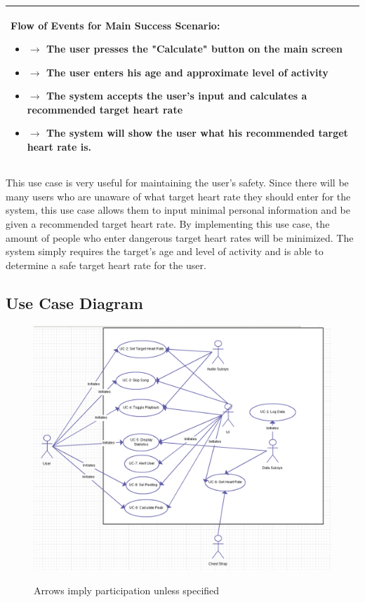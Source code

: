 \documentclass[letterpaper,english, 12pt]{scrreprt}
\begin{document}
\begin{center}
\begin{longtable}{|C{15cm}|}
\begin{flushleft}
                                \textbf{Flow of Events for Main Success Scenario: }
                        \end{flushleft}
                                \begin{itemize}
                                        \item $\rightarrow$ The user presses the "Calculate" button on the main screen
                                        \item $\rightarrow$ The user enters his age and approximate level of activity
                                        \item $\rightarrow$ The system accepts the user's input and calculates a recommended target heart rate
					\item $\rightarrow$ The system will show the user what his recommended target heart rate is.
                                \end{itemize}
                       \\
                \hline
        \end{longtable}
\end{center}

This use case is very useful for maintaining the user's safety. Since there will be many users who are unaware of what target heart rate they should enter for the system, this use case allows them to input minimal personal information and be given a recommended target heart rate. By implementing this use case, the amount of people who enter dangerous target heart rates will be minimized. The system simply requires the target's age and level of activity and is able to determine a safe target heart rate for the user.

\subsection{Use Case Diagram}
\begin{figure}[H]
	\centering
	\includegraphics[width=\textwidth]{img/use_case.png}\\
    \caption{Arrows imply participation unless specified}
\end{figure}
\end{document}

